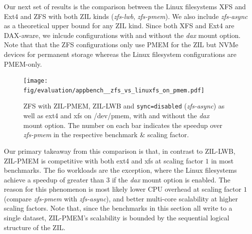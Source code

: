 \documentclass[12pt,a4paper,twoside]{book}
\begin{document}
Our next set of results is the comparison between the Linux filesystems XFS and Ext4 and ZFS with both ZIL kinds (\textit{zfs-lwb}, \textit{zfs-pmem}).
We also include \textit{zfs-async} as a theoretical upper bound for any ZIL kind.
Since both XFS and Ext4 are DAX-aware, we inlcude configurations with and without the \textit{dax} mount option.
Note that that the ZFS configurations only use PMEM for the ZIL but NVMe devices for permanent storage whereas the Linux filesystem configurations are PMEM-only.

\begin{figure}[H]
    \centering
    \texttt{[image: fig/evaluation/appbench\_\_zfs\_vs\_linuxfs\_on\_pmem.pdf]}
    \caption{
        ZFS with ZIL-PMEM, ZIL-LWB and \lstinline{sync=disabled} (\textit{zfs-async}) as well as ext4 and xfs on /dev/pmem, with and without the \textit{dax} mount option.
        The number on each bar indicates the speedup over \textit{zfs-pmem} in the respective benchmark \& scaling factor.
    }
\end{figure}

Our primary takeaway from this comparison is that, in contrast to ZIL-LWB, ZIL-PMEM is competitive with both ext4 and xfs at scaling factor $1$ in most benchmarks.
The fio workloads are the exception, where the Linux filesystems achieve a speedup of greater than 3 if the \textit{dax} mount option is enabled.
The reason for this phenomenon is most likely lower CPU overhead at scaling factor $1$ (compare \textit{zfs-pmem} with \textit{zfs-async}), and better multi-core scalability at higher scaling factors.
Note that, since the benchmarks in this section all write to a single dataset, ZIL-PMEM's scalability is bounded by the sequential logical structure of the ZIL.
\end{document}
